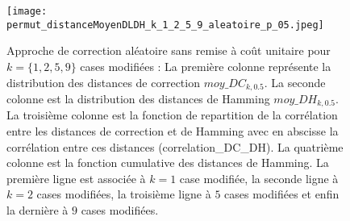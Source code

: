 \begin{figure}[htb!] 
\texttt{[image: permut\_distanceMoyenDLDH\_k\_1\_2\_5\_9\_aleatoire\_p\_05.jpeg]}
\caption{ Approche de correction al\'eatoire sans remise \`a co\^ut unitaire pour $k =\{1,2,5,9\} $ cases modifi\'ees :
 La premi\`ere colonne repr\'esente la distribution des distances de correction $moy\_DC_{k,0.5}$. La seconde colonne est la distribution des distances de Hamming $moy\_DH_{k,0.5}$. 
 La troisi\`eme colonne  est la fonction de repartition de la corr\'elation entre les distances de correction et de Hamming avec en abscisse la corr\'elation entre ces distances (correlation\_DC\_DH).  
 La quatri\`eme colonne est la fonction cumulative des distances de Hamming. 
 La premi\`ere ligne est associ\'ee \`a $k=1$ case modifi\'ee, 
 la seconde ligne \`a $k=2$ cases modifi\'ees, 
 la troisi\`eme ligne \`a $5$ cases modifi\'ees et enfin 
 la derni\`ere \`a $9$ cases modifi\'ees.
 }
\label{sansremise_unitaire_distanceMoyenDCDH_k_1_2_5_9_aleatoire_p_05} 
\end{figure}
\FloatBarrier

